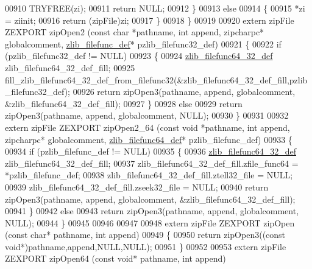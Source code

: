 \begin{DoxyCode}
00910         TRYFREE(zi);
00911         \textcolor{keywordflow}{return} NULL;
00912     \}
00913     \textcolor{keywordflow}{else}
00914     \{
00915         *zi = ziinit;
00916         \textcolor{keywordflow}{return} (zipFile)zi;
00917     \}
00918 \}
00919 
00920 \textcolor{keyword}{extern} zipFile ZEXPORT zipOpen2 (\textcolor{keyword}{const} \textcolor{keywordtype}{char} *pathname, \textcolor{keywordtype}{int} append, zipcharpc* globalcomment, 
      \hyperlink{structzlib__filefunc__def__s}{zlib\_filefunc\_def}* pzlib\_filefunc32\_def)
00921 \{
00922     \textcolor{keywordflow}{if} (pzlib\_filefunc32\_def != NULL)
00923     \{
00924         \hyperlink{structzlib__filefunc64__32__def__s}{zlib\_filefunc64\_32\_def} zlib\_filefunc64\_32\_def\_fill;
00925         fill\_zlib\_filefunc64\_32\_def\_from\_filefunc32(&zlib\_filefunc64\_32\_def\_fill,pzlib\_filefunc32\_def);
00926         \textcolor{keywordflow}{return} zipOpen3(pathname, append, globalcomment, &zlib\_filefunc64\_32\_def\_fill);
00927     \}
00928     \textcolor{keywordflow}{else}
00929         \textcolor{keywordflow}{return} zipOpen3(pathname, append, globalcomment, NULL);
00930 \}
00931 
00932 \textcolor{keyword}{extern} zipFile ZEXPORT zipOpen2\_64 (\textcolor{keyword}{const} \textcolor{keywordtype}{void} *pathname, \textcolor{keywordtype}{int} append, zipcharpc* globalcomment, 
      \hyperlink{structzlib__filefunc64__def__s}{zlib\_filefunc64\_def}* pzlib\_filefunc\_def)
00933 \{
00934     \textcolor{keywordflow}{if} (pzlib\_filefunc\_def != NULL)
00935     \{
00936         \hyperlink{structzlib__filefunc64__32__def__s}{zlib\_filefunc64\_32\_def} zlib\_filefunc64\_32\_def\_fill;
00937         zlib\_filefunc64\_32\_def\_fill.zfile\_func64 = *pzlib\_filefunc\_def;
00938         zlib\_filefunc64\_32\_def\_fill.ztell32\_file = NULL;
00939         zlib\_filefunc64\_32\_def\_fill.zseek32\_file = NULL;
00940         \textcolor{keywordflow}{return} zipOpen3(pathname, append, globalcomment, &zlib\_filefunc64\_32\_def\_fill);
00941     \}
00942     \textcolor{keywordflow}{else}
00943         \textcolor{keywordflow}{return} zipOpen3(pathname, append, globalcomment, NULL);
00944 \}
00945 
00946 
00947 
00948 \textcolor{keyword}{extern} zipFile ZEXPORT zipOpen (\textcolor{keyword}{const} \textcolor{keywordtype}{char}* pathname, \textcolor{keywordtype}{int} append)
00949 \{
00950     \textcolor{keywordflow}{return} zipOpen3((\textcolor{keyword}{const} \textcolor{keywordtype}{void}*)pathname,append,NULL,NULL);
00951 \}
00952 
00953 \textcolor{keyword}{extern} zipFile ZEXPORT zipOpen64 (\textcolor{keyword}{const} \textcolor{keywordtype}{void}* pathname, \textcolor{keywordtype}{int} append)

\end{DoxyCode}
